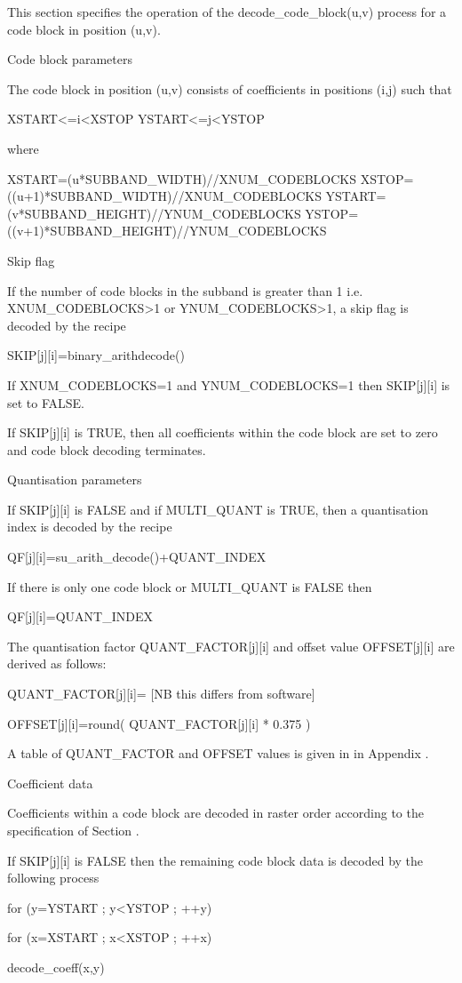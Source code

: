 This section specifies the operation of the decode\_code\_block(u,v)
process for a code block in position (u,v).

Code block parameters

The code block in position (u,v) consists of coefficients in positions
(i,j) such that

XSTART<=i<XSTOP
YSTART<=j<YSTOP

where

XSTART=(u*SUBBAND\_WIDTH)//XNUM\_CODEBLOCKS
XSTOP=((u+1)*SUBBAND\_WIDTH)//XNUM\_CODEBLOCKS
YSTART=(v*SUBBAND\_HEIGHT)//YNUM\_CODEBLOCKS
YSTOP=((v+1)*SUBBAND\_HEIGHT)//YNUM\_CODEBLOCKS

Skip flag

If the number of code blocks in the subband is greater than 1 i.e.
XNUM\_CODEBLOCKS>1 or YNUM\_CODEBLOCKS>1, a skip flag is decoded by the
recipe

SKIP[j][i]=binary\_arithdecode()

If XNUM\_CODEBLOCKS=1 and YNUM\_CODEBLOCKS=1 then SKIP[j][i] is set to
FALSE.

If SKIP[j][i] is TRUE, then all coefficients within the code block are
set to zero and code block decoding terminates.

Quantisation parameters

If SKIP[j][i] is FALSE and if MULTI\_QUANT is TRUE, then a quantisation
index is decoded by the recipe

QF[j][i]=su\_arith\_decode()+QUANT\_INDEX

If there is only one code block or MULTI\_QUANT is FALSE then

QF[j][i]=QUANT\_INDEX

The quantisation factor QUANT\_FACTOR[j][i] and offset value OFFSET[j][i]
are derived as follows:

QUANT\_FACTOR[j][i]= [NB this differs from software]

OFFSET[j][i]=round( QUANT\_FACTOR[j][i] * 0.375 )

A table of QUANT\_FACTOR and OFFSET values is given in  in Appendix .

Coefficient data

Coefficients within a code block are decoded in raster order according
to the specification of Section .

If SKIP[j][i] is FALSE then the remaining code block data is decoded by
the following process

for (y=YSTART ; y<YSTOP ; ++y)

{

    for (x=XSTART ; x<XSTOP ; ++x)

        decode\_coeff(x,y)

}


